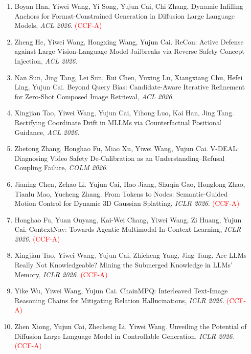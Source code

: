 \begin{enumerate}
\item Boyan Han, Yiwei Wang, Yi Song, Yujun Cai, Chi Zhang. Dynamic Infilling Anchors for Format-Constrained Generation in Diffusion Large Language Models, \textit{ACL 2026}. \textcolor{red}{(CCF-A)}

\item Zheng He, Yiwei Wang, Hongxing Wang, Yujun Cai. ReCon: Active Defense against Large Vision-Language Model Jailbreaks via Reverse Safety Concept Injection, \textit{ACL 2026}.

\item Nan Sun, Jing Tang, Lei Sun, Rui Chen, Yuxing Lu, Xiangxiang Chu, Hefei Ling, Yujun Cai. Beyond Query Bias: Candidate-Aware Iterative Refinement for Zero-Shot Composed Image Retrieval, \textit{ACL 2026}.

\item Xingjian Tao, Yiwei Wang, Yujun Cai, Yihong Luo, Kai Han, Jing Tang. Rectifying Coordinate Drift in MLLMs via Counterfactual Positional Guidance, \textit{ACL 2026}.

\item Zhetong Zhang, Honghao Fu, Miao Xu, Yiwei Wang, Yujun Cai. V-DEAL: Diagnosing Video Safety De-Calibration as an Understanding--Refusal Coupling Failure, \textit{COLM 2026}.

\item Jianing Chen, Zehao Li, Yujun Cai, Hao Jiang, Shuqin Gao, Honglong Zhao, Tianlu Mao, Yucheng Zhang. From Tokens to Nodes: Semantic-Guided Motion Control for Dynamic 3D Gaussian Splatting, \textit{ICLR 2026}. \textcolor{red}{(CCF-A)}

\item Honghao Fu, Yuan Ouyang, Kai-Wei Chang, Yiwei Wang, Zi Huang, Yujun Cai. ContextNav: Towards Agentic Multimodal In-Context Learning, \textit{ICLR 2026}. \textcolor{red}{(CCF-A)}

\item Xingjian Tao, Yiwei Wang, Yujun Cai, Zhicheng Yang, Jing Tang. Are LLMs Really Not Knowledgeable? Mining the Submerged Knowledge in LLMs' Memory, \textit{ICLR 2026}. \textcolor{red}{(CCF-A)}

\item Yike Wu, Yiwei Wang, Yujun Cai. ChainMPQ: Interleaved Text-Image Reasoning Chains for Mitigating Relation Hallucinations, \textit{ICLR 2026}. \textcolor{red}{(CCF-A)}

\item Zhen Xiong, Yujun Cai, Zhecheng Li, Yiwei Wang. Unveiling the Potential of Diffusion Large Language Model in Controllable Generation, \textit{ICLR 2026}. \textcolor{red}{(CCF-A)}


\end{enumerate}
